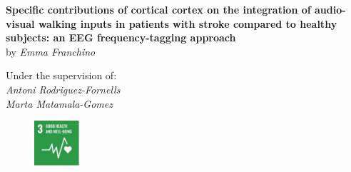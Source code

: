 \begin{titlepage}
\vspace{15mm}
\begin{center}
  {\Large\textbf{Specific contributions of cortical cortex on the integration of audio-visual walking inputs in patients with stroke compared to healthy subjects: an EEG frequency-tagging approach}}
  \vspace{15mm}
  \\ {\Large{by \textit{Emma Franchino}}}
\end{center}
\vspace{17mm}

\begin{center}
  {\Large{{Under the supervision of:}\\ \textit{Antoni Rodriguez-Fornells \\ Marta Matamala-Gomez}}}
\end{center}

\vspace{4mm}
\begin{figure}[h]
    \centering
    \includegraphics[width=0.15\textwidth]{images/Picture 1.jpg}
\end{figure}

\end{titlepage}